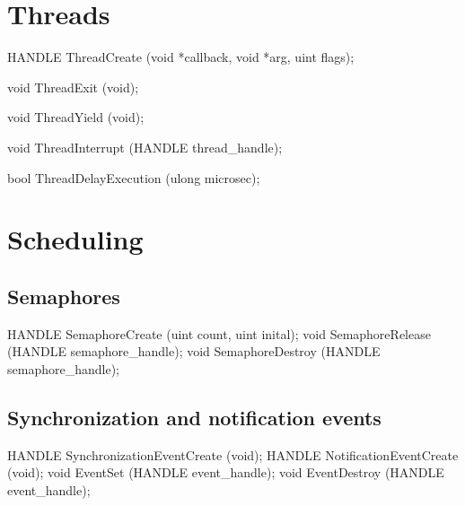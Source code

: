 \section{Threads}
\label{sec:abi:thread}


\begin{paldef}
HANDLE ThreadCreate (void *callback, void *arg,
                     uint flags);
\end{paldef}



\begin{paldef}
void ThreadExit (void);
\end{paldef}



\begin{paldef}
void ThreadYield (void);
\end{paldef}



\begin{paldef}
void ThreadInterrupt (HANDLE thread_handle);
\end{paldef}



\begin{paldef}
bool ThreadDelayExecution (ulong microsec);
\end{paldef}





\section{Scheduling}


\subsection*{Semaphores}

\begin{paldef}
HANDLE SemaphoreCreate (uint count, uint inital);
void SemaphoreRelease (HANDLE semaphore_handle);
void SemaphoreDestroy (HANDLE semaphore_handle);
\end{paldef}




\subsection*{Synchronization and notification events}

\begin{paldef}
HANDLE SynchronizationEventCreate (void);
HANDLE NotificationEventCreate (void);
void EventSet (HANDLE event_handle);
void EventDestroy (HANDLE event_handle);
\end{paldef}



